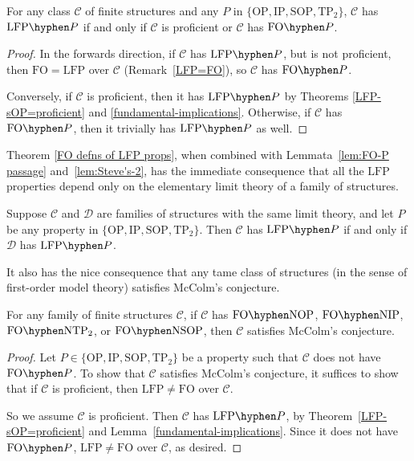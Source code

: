 \documentclass{lmcs}
\newcommand{\LFP}{\mathrm{LFP}}
\newcommand{\FO}{\mathrm{FO}}
\newcommand{\FOP}[1]{\FO\hyphen#1}
\newcommand{\LFPP}[1]{\LFP\hyphen#1}
\newcommand{\OP}{\mathrm{OP}}
\newcommand{\NOP}{\mathrm{NOP}}
\newcommand{\IP}{\mathrm{IP}}
\newcommand{\NIP}{\mathrm{NIP}}
\newcommand{\SOP}{\mathrm{SOP}}
\newcommand{\NSOP}{\mathrm{NSOP}}
\newcommand{\TPT}{\mathrm{TP}_2}
\newcommand{\NTPT}{\mathrm{NTP}_2}
\theoremstyle{thmC}
\begin{document}
\begin{thm}\label{FO defns of LFP props}
For any class $\mathcal{C}$ of finite structures and any $P$ in $\{\OP,\IP,\SOP,\TPT\}$, 
$\mathcal{C}$ has $\LFPP{P}$ if and only if $\mathcal{C}$ is proficient or $\mathcal{C}$ has  $\FOP{P}$.
\end{thm}

\begin{proof}
In the forwards direction, if $\mathcal{C}$ has $\LFPP{P}$, but is not proficient, then $\FO = \LFP$ over $\mathcal{C}$ (Remark~\ref{LFP=FO}), so $\mathcal{C}$ has $\FOP{P}$.

Conversely, if $\mathcal{C}$ is proficient, then it has $\LFPP{P}$ by Theorems \ref{LFP-sOP=proficient} and \ref{fundamental-implications}. Otherwise, if $\mathcal{C}$ has $\FOP{P}$, then it trivially has $\LFPP{P}$ as well.
\end{proof}

Theorem \ref{FO defns of LFP props}, when combined with Lemmata~\ref{lem:FO-P passage} and~\ref{lem:Steve's-2}, has the immediate consequence that all the $\LFP$ properties depend only on the elementary limit theory of a family of structures.

\begin{cor}\label{FO theory defns of LFP props}
Suppose $\mathcal{C}$ and $\mathcal{D}$ are families of structures with the same limit theory, and let $P$ be any property in $\{\OP,\IP,\SOP,\TPT\}$. Then
$\mathcal{C}$ has $\LFPP{P}$ if and only if $ \mathcal{D}$ has $\LFPP{P}$.
\end{cor}

It also has the nice consequence that any tame class of structures (in the sense of first-order model theory) satisfies McColm's conjecture.

\begin{thm}\label{tame-McColm}
For any family of finite structures $\mathcal{C}$, if $\mathcal{C}$ has $\FOP{\NOP}$, $\FOP{\NIP}$, $\FOP{\NTPT}$, or $\FOP{\NSOP}$, then $\mathcal{C}$ satisfies McColm's conjecture.
\end{thm}

\begin{proof}
Let $P\in \{\OP,\IP,\SOP,\TPT\}$ be a property such that $\mathcal{C}$ does not have $\FOP{P}$. To show that $\mathcal{C}$ satisfies McColm's conjecture, it suffices to show that if $\mathcal{C}$ is proficient, then $\LFP\neq \FO$ over $\mathcal{C}$. 

So we assume $\mathcal{C}$ is proficient. Then $\mathcal{C}$ has $\LFPP{P}$, by Theorem~\ref{LFP-sOP=proficient} and Lemma~\ref{fundamental-implications}. Since it does not have $\FOP{P}$, $\LFP\neq \FO$ over $\mathcal{C}$, as desired.
\end{proof}
\end{document}
